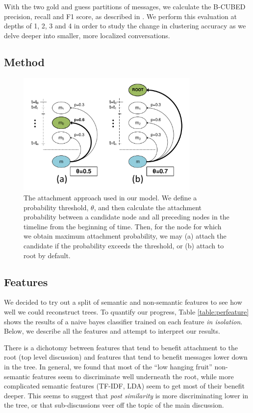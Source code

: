 \documentclass{article}
\begin{document}
With the two gold and guess partitions of messages, we calculate the B-CUBED
precision, recall and F1 score, as described in \cite{Bagga98}. We perform
this evaluation at depths of 1, 2, 3 and 4 in order to study the change in
clustering accuracy as we delve deeper into smaller, more localized
conversations.

\subsection{Method}
\begin{figure}
  \centering
  \includegraphics[width=0.8\textwidth]{attachment.pdf}
  \caption{The attachment approach used in our model. We define a probability threshold, 
  $\theta$, and then calculate the attachment probability between a candidate node 
  and all preceding nodes in the timeline from the beginning of time. Then, for the 
  node for which we obtain maximum attachment probability, we may (a) attach the candidate if the probability exceeds the threshold, or (b) attach to root by default.}
  \label{fig:attachment}
\end{figure}

\subsection{Features}
\label{sec:features}
We decided to try out a split of semantic and non-semantic features to see how 
well we could reconstruct trees. To quantify our progress, Table
\ref{table:perfeature} shows the results of a naive bayes classifier trained on
each feature \textit{in isolation}. Below, we describe all the features and
attempt to interpret our results. 

There is a dichotomy between features that tend to benefit attachment to the root (top
level discussion) and features that tend to benefit messages lower down in the
tree. In general, we found that most of the ``low hanging fruit'' non-semantic
features seem to discriminate well underneath the root, while more complicated
semantic features (TF-IDF, LDA) seem to get most of their benefit deeper. This
seems to suggest that \textit{post similarity} is more discriminating lower in
the tree, or that sub-discussions veer off the topic of the main discussion. 
\end{document}
